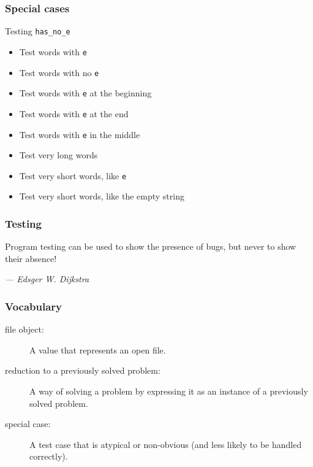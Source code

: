 \documentclass{beamer}
\newcommand{\bi}{\begin{itemize}}
\newcommand{\li}{\item}
\newcommand{\ei}{\end{itemize}}
\newcommand{\bfr}[1]{\begin{frame}[fragile]\frametitle{{ #1 }}}
\begin{document}
\bfr{Special cases}
Testing \lstinline{has_no_e}
\bi
\li Test words with {\tt e}
\li Test words with no {\tt e}
\li Test words with {\tt e} at the beginning
\li Test words with {\tt e} at the end
\li Test words with {\tt e} in the middle
\li Test very long words
\li Test very short words, like {\tt e}
\li Test very short words, like the empty string
\ei
\end{frame}

\bfr{Testing}


Program testing can be used to show the presence of bugs, but never to show their absence!

\sl
\hfill — Edsger W. Dijkstra



\end{frame}


\bfr{Vocabulary}
\begin{description}
\li[file object:]
A value that represents an open file.
\li[reduction to a previously solved problem:]
A way of solving a problem by expressing it as an instance of a previously solved problem.
\li[special case:]
A test case that is atypical or non-obvious (and less likely to be handled correctly).
\end{description}
\end{frame}
\end{document}
